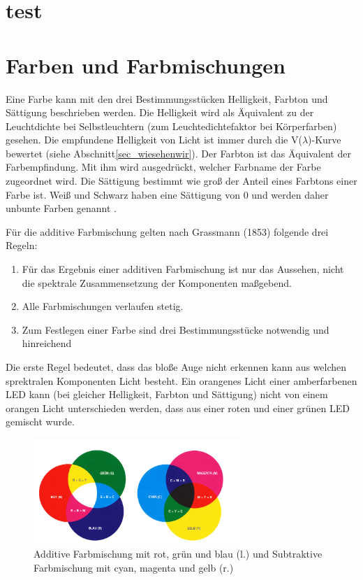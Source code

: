 \section{test}

\section{Farben und Farbmischungen}
Eine Farbe kann mit den drei Bestimmungsstücken Helligkeit, Farbton und Sättigung beschrieben werden. Die Helligkeit wird als Äquivalent zu der Leuchtdichte bei Selbstleuchtern (zum Leuchtedichtefaktor bei Körperfarben) gesehen. Die empfundene Helligkeit von Licht ist immer durch die V($\lambda$)-Kurve bewertet (siehe Abschnitt\ref{sec_wiesehenwir}).
Der Farbton ist das Äquivalent der Farbempfindung. Mit ihm wird ausgedrückt, welcher Farbname der Farbe zugeordnet wird.
Die Sättigung bestimmt wie groß der Anteil eines Farbtons einer Farbe ist. Weiß und Schwarz haben eine Sättigung von 0 und werden daher unbunte Farben genannt \citep[S.102-103]{hentschel}.


Für die additive Farbmischung gelten nach Grassmann (1853) folgende drei Regeln:

\begin{enumerate}\setlength{\itemsep}{0ex}
\item Für das Ergebnis einer additiven Farbmischung ist nur das Aussehen, nicht die spektrale Zusammensetzung der Komponenten maßgebend.
\item Alle Farbmischungen verlaufen stetig.
\item Zum Festlegen einer Farbe sind drei Bestimmungsstücke notwendig und hinreichend 
\end{enumerate}

Die erste Regel bedeutet, dass das bloße Auge nicht erkennen kann aus welchen sprektralen Komponenten Licht besteht. Ein orangenes Licht einer amberfarbenen LED kann (bei gleicher Helligkeit, Farbton und Sättigung) nicht von einem orangen Licht unterschieden werden, dass aus einer roten und einer grünen LED gemischt wurde.

\begin{figure}[htp]     %
\centering
\includegraphics[width=0.7\textwidth]{bilder/additve_und_subtraktive_Farben} 
\caption {Additive Farbmischung mit rot, grün und blau (l.) und Subtraktive Farbmischung mit cyan, magenta und gelb (r.) \protect\footnotemark}
\end{figure}

